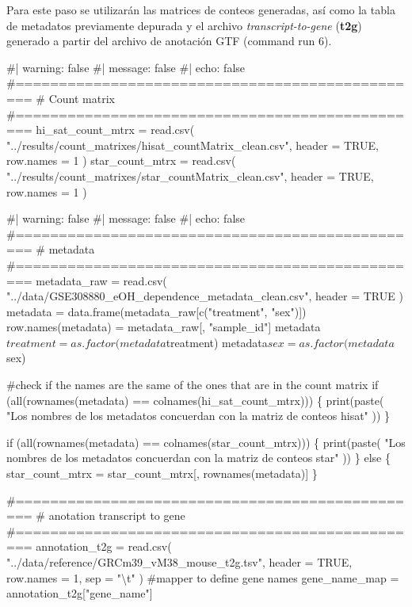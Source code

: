 \documentclass[
  10pt,
]{article}
\newenvironment{Shaded}{\begin{snugshade}}{\end{snugshade}}
\newcommand{\NormalTok}[1]{\textcolor[rgb]{0.00,0.23,0.31}{#1}}
\begin{document}
Para este paso se utilizarán las matrices de conteos generadas, así como
la tabla de metadatos previamente depurada y el archivo
\emph{transcript-to-gene} (\textbf{t2g}) generado a partir del archivo
de anotación GTF (command run 6).

\begin{Shaded}
\begin{Highlighting}[]
\NormalTok{\#| warning: false}
\NormalTok{\#| message: false}
\NormalTok{\#| echo: false}
\NormalTok{\#================================================}
\NormalTok{\# Count matrix}
\NormalTok{\#================================================}
\NormalTok{hi\_sat\_count\_mtrx = read.csv(}
\NormalTok{  "../results/count\_matrixes/hisat\_countMatrix\_clean.csv",}
\NormalTok{  header = TRUE,}
\NormalTok{  row.names = 1}
\NormalTok{)}
\NormalTok{star\_count\_mtrx = read.csv(}
\NormalTok{  "../results/count\_matrixes/star\_countMatrix\_clean.csv",}
\NormalTok{  header = TRUE,}
\NormalTok{  row.names = 1}
\NormalTok{)}
\end{Highlighting}
\end{Shaded}

\begin{Shaded}
\begin{Highlighting}[]
\NormalTok{\#| warning: false}
\NormalTok{\#| message: false}
\NormalTok{\#| echo: false}
\NormalTok{\#================================================}
\NormalTok{\# metadata}
\NormalTok{\#================================================}
\NormalTok{metadata\_raw = read.csv(}
\NormalTok{  "../data/GSE308880\_eOH\_dependence\_metadata\_clean.csv",}
\NormalTok{  header = TRUE}
\NormalTok{)}
\NormalTok{metadata = data.frame(metadata\_raw[c("treatment", "sex")])}
\NormalTok{row.names(metadata) = metadata\_raw[, "sample\_id"]}
\NormalTok{metadata$treatment = as.factor(metadata$treatment)}
\NormalTok{metadata$sex = as.factor(metadata$sex)}

\NormalTok{\#check if the names are the same of the ones that are in the count matrix}
\NormalTok{if (all(rownames(metadata) == colnames(hi\_sat\_count\_mtrx))) \{}
\NormalTok{  print(paste(}
\NormalTok{    "Los nombres de los metadatos concuerdan con la matriz de conteos hisat"}
\NormalTok{  ))}
\NormalTok{\}}

\NormalTok{if (all(rownames(metadata) == colnames(star\_count\_mtrx))) \{}
\NormalTok{  print(paste(}
\NormalTok{    "Los nombres de los metadatos concuerdan con la matriz de conteos star"}
\NormalTok{  ))}
\NormalTok{\} else \{}
\NormalTok{  star\_count\_mtrx = star\_count\_mtrx[, rownames(metadata)]}
\NormalTok{\}}

\NormalTok{\#================================================}
\NormalTok{\# anotation transcript to gene}
\NormalTok{\#================================================}
\NormalTok{annotation\_t2g = read.csv(}
\NormalTok{  "../data/reference/GRCm39\_vM38\_mouse\_t2g.tsv",}
\NormalTok{  header = TRUE,}
\NormalTok{  row.names = 1,}
\NormalTok{  sep = "\textbackslash{}t"}
\NormalTok{)}
\NormalTok{\#mapper to define gene names}
\NormalTok{gene\_name\_map = annotation\_t2g["gene\_name"]}
\end{Highlighting}
\end{Shaded}
\end{document}
